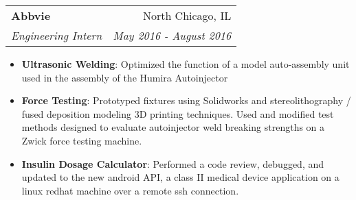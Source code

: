 \documentclass[letterpaper,10pt]{article}
\makeatletter
\newcommand{\resumeItem}[2]{
  \item\small{
    \textbf{#1}{: #2 \vspace{-2pt}}
  }
}
\newcommand{\resumeSubheading}[4]{
  \vspace{1pt}\item
    \begin{tabular*}{0.97\textwidth}{l@{\extracolsep{\fill}}r}
      \textbf{#1} & #2 \\
      \textit{\small#3} & \textit{\footnotesize  #4} \\
    \end{tabular*}\vspace{-8pt}
}
\newcommand{\resumeItemListStart}{\begin{itemize}}
\newcommand{\resumeItemListEnd}{\end{itemize}\vspace{-8pt}}
\makeatother
\begin{document}
  
  

    \resumeSubheading
      {Abbvie}{North Chicago, IL}
      {Engineering Intern}{May 2016 - August 2016}
      \resumeItemListStart
       \resumeItem{Ultrasonic Welding}
        {Optimized the function of a model auto-assembly unit used in the assembly of the Humira Autoinjector}
        \resumeItem{Force Testing}
          {Prototyped fixtures using Solidworks and stereolithography / fused deposition modeling 3D printing techniques. Used and modified test methods designed to evaluate autoinjector weld breaking strengths on a Zwick force testing machine.}
        \resumeItem{Insulin Dosage Calculator}
        	 {Performed a code review, debugged, and updated to the new android API, a class II medical device application on a linux redhat machine over a remote ssh connection.}
      \resumeItemListEnd

     
     
     
\end{document}
